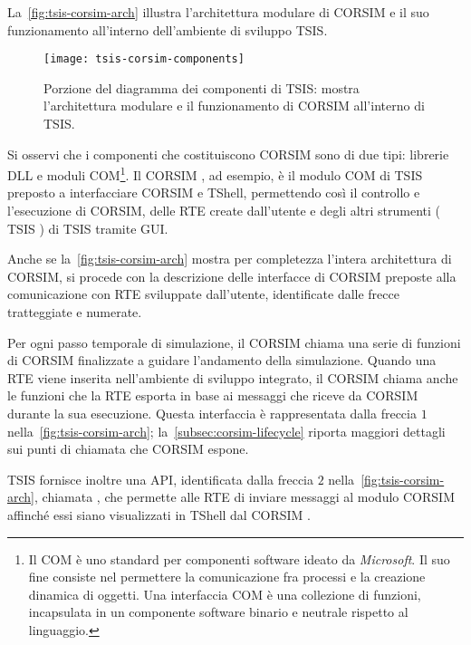 La~\vref{fig:tsis-corsim-arch} illustra l'architettura modulare di \acs{CORSIM} e il suo funzionamento all'interno dell'ambiente di sviluppo \acs{TSIS}.
\begin{figure}
    \centering
    \texttt{[image: tsis-corsim-components]}
    \caption[Diagramma dei componenti di \acs{CORSIM}]{Porzione del diagramma dei componenti di \acs{TSIS}: mostra l'architettura modulare e il funzionamento di \acs{CORSIM} all'interno di \acs{TSIS}.}
    \label{fig:tsis-corsim-arch}
\end{figure}
Si osservi che i componenti che costituiscono \acs{CORSIM} sono di due tipi: librerie \acs{DLL} e moduli \acs{COM}\footnote{Il \acf{COM} è uno standard per componenti software ideato da \emph{Microsoft}. Il suo fine consiste nel permettere la comunicazione fra processi e la creazione dinamica di oggetti. Una interfaccia \acs{COM} è una collezione di funzioni, incapsulata in un componente software binario e neutrale rispetto al linguaggio.}. Il \acs{CORSIM} , ad esempio, è il modulo \acs{COM} di \acs{TSIS} preposto a interfacciare \acs{CORSIM} e \acs{TShell}, permettendo così il controllo e l'esecuzione di \acs{CORSIM}, delle \acs{RTE} create dall'utente e degli altri strumenti (\eg{} \acs{TSIS} ) di \acs{TSIS} tramite \acs{GUI}.

Anche se la~\vref{fig:tsis-corsim-arch} mostra per completezza l'intera architettura di \acs{CORSIM}, si procede con la descrizione delle interfacce di \acs{CORSIM} preposte alla comunicazione con \acs{RTE} sviluppate dall'utente, identificate dalle frecce tratteggiate e numerate.

Per ogni passo temporale di simulazione, il \acs{CORSIM}  chiama una serie di funzioni di \acs{CORSIM} finalizzate a guidare l'andamento della simulazione. Quando una \acs{RTE} viene inserita nell'ambiente di sviluppo integrato, il \acs{CORSIM}  chiama anche le funzioni che la \acs{RTE} esporta in base ai messaggi che riceve da \acs{CORSIM} durante la sua esecuzione. Questa interfaccia è rappresentata dalla freccia $1$ nella~\vref{fig:tsis-corsim-arch}; la~\autoref{subsec:corsim-lifecycle}  riporta maggiori dettagli sui punti di chiamata che \acs{CORSIM} espone.

\acs{TSIS} fornisce inoltre una \acs{API}, identificata dalla freccia $2$ nella~\vref{fig:tsis-corsim-arch}, chiamata , che permette alle \acs{RTE} di inviare messaggi al modulo \acs{CORSIM}  affinché essi siano visualizzati in \acs{TShell} dal \acs{CORSIM} .

